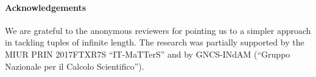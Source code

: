 \documentclass[a4paper]{elsarticle}
\newcommand{\1}{\mathbf{1}}
\def\odiv{{ \ominus\hspace{-8pt}:}\;}
\begin{document}


\paragraph*{Acknowledgements}
We are grateful to the anonymous reviewers for pointing us to a simpler approach in tackling tuples of infinite length. 
The research was partially supported by the MIUR PRIN 2017FTXR7S ``IT-MaTTerS'' and by GNCS-INdAM (``Gruppo Nazionale per il Calcolo Scientifico'').

%
%

%
\end{document}
